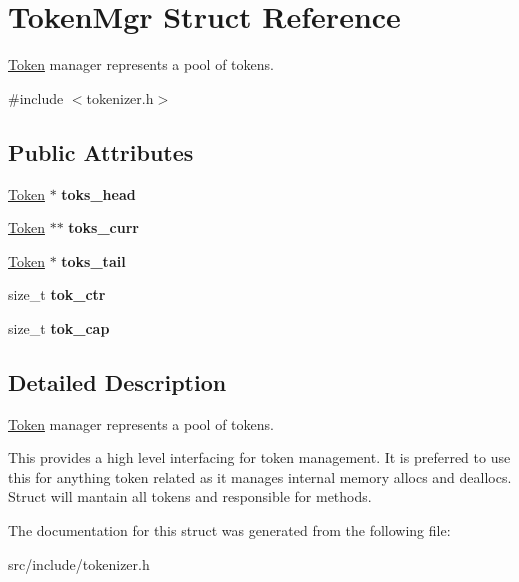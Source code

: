 \hypertarget{struct_token_mgr}{}\section{Token\+Mgr Struct Reference}
\label{struct_token_mgr}


\mbox{\hyperlink{struct_token}{Token}} manager represents a pool of tokens.  




{\ttfamily \#include $<$tokenizer.\+h$>$}

\subsection*{Public Attributes}
\begin{DoxyCompactItemize}
\item 
\mbox{\label{struct_token_mgr_aee9bee2443af37eae9fa475620873646}} 
\mbox{\hyperlink{struct_token}{Token}} $\ast$ {\bfseries toks\+\_\+head}
\item 
\mbox{\label{struct_token_mgr_a3d36fd3a48a52dbd497fa83eea77bbb8}} 
\mbox{\hyperlink{struct_token}{Token}} $\ast$$\ast$ {\bfseries toks\+\_\+curr}
\item 
\mbox{\label{struct_token_mgr_ad9416707c973324743b48586e20c7bee}} 
\mbox{\hyperlink{struct_token}{Token}} $\ast$ {\bfseries toks\+\_\+tail}
\item 
\mbox{\label{struct_token_mgr_a764c0f04ff55f5e23b727b1c7de8003e}} 
size\+\_\+t {\bfseries tok\+\_\+ctr}
\item 
\mbox{\label{struct_token_mgr_a6c51c54b6a2a05ad7f54a6e33c63e5fb}} 
size\+\_\+t {\bfseries tok\+\_\+cap}
\end{DoxyCompactItemize}


\subsection{Detailed Description}
\mbox{\hyperlink{struct_token}{Token}} manager represents a pool of tokens. 

This provides a high level interfacing for token management. It is preferred to use this for anything token related as it manages internal memory allocs and deallocs. Struct will mantain all tokens and responsible for methods. 

The documentation for this struct was generated from the following file\+:\begin{DoxyCompactItemize}
\item 
src/include/tokenizer.\+h\end{DoxyCompactItemize}
